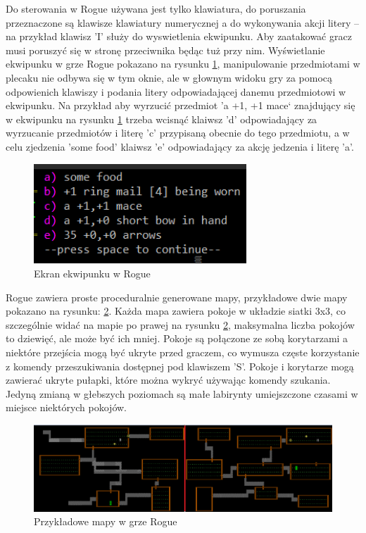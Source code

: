 \documentclass[12pt,twoside]{article}
\begin{document}
Do sterowania w Rogue używana jest tylko klawiatura, do poruszania przeznaczone są klawisze klawiatury numerycznej a do wykonywania akcji litery -- na przykład klawisz 'I' służy do wyswietlenia ekwipunku. Aby zaatakować gracz musi poruszyć się w stronę przeciwnika będąc tuż przy nim. Wyświetlanie ekwipunku w grze Rogue pokazano na rysunku \ref{Rogue:scr2}, manipulowanie przedmiotami w plecaku nie odbywa się w tym oknie, ale w głownym widoku gry za pomocą odpowienich klawiszy i podania litery odpowiadającej danemu przedmiotowi w ekwipunku. Na przykład aby wyrzucić przedmiot 'a +1, +1 mace` znajdujący się w ekwipunku na rysunku \ref{Rogue:scr2} trzeba wcisnąć klaiwsz 'd' odpowiadający za wyrzucanie przedmiotów i literę 'c' przypisaną obecnie do tego przedmiotu, a w celu zjedzenia 'some food' klaiwsz 'e' odpowiadający za akcję jedzenia i literę 'a'. 

\FloatBarrier
\begin{figure}[h]
	\centering
	\includegraphics[width=8cm]{images/rogue/scr2.png}
	\caption{Ekran ekwipunku w Rogue}
	\label{Rogue:scr2}
\end{figure}
\FloatBarrier

Rogue zawiera proste proceduralnie generowane mapy, przykładowe dwie mapy pokazano na rysunku: \ref{Rogue:scr3}. Każda mapa zawiera pokoje w układzie siatki 3x3, co szczególnie widać na mapie po prawej na rysunku \ref{Rogue:scr3}, maksymalna liczba pokojów to dziewięć, ale może być ich mniej. Pokoje są połączone ze sobą korytarzami a niektóre przejścia mogą być ukryte przed graczem, co wymusza częste korzystanie z komendy przeszukiwania dostępnej pod klawiszem 'S'. Pokoje i korytarze mogą zawierać ukryte pułapki, które można wykryć używając komendy szukania. Jedyną zmianą w głebszych poziomach są małe labirynty umiejszczone czasami w miejsce niektórych pokojów.

\FloatBarrier
\begin{figure}[h]
	\centering
	\includegraphics[width=16cm]{images/rogue/scr3.png}
	\caption{Przykładowe mapy w grze Rogue}
	\label{Rogue:scr3}
\end{figure}
\FloatBarrier
\end{document}
